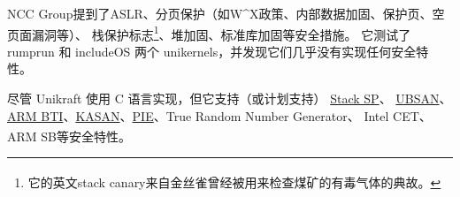 \documentclass[UTF8,fontset=none,linespread=1.15]{ctexart}
\let\nosupcite\cite
\renewcommand*{\cite}[1]{\textsuperscript{\nosupcite{#1}}}
\begin{document}
NCC Group提到了ASLR、分页保护（如W\^{}X政策、内部数据加固、保护页、空页面漏洞等）、
栈保护标志\footnote{它的英文stack canary来自金丝雀曾经被用来检查煤矿的有毒气体的典故\cite{bib:canary}。}、堆加固、标准库加固等安全措施。
它测试了 rumprun 和 includeOS 两个 unikernels，并发现它们几乎没有实现任何安全特性。

尽管 Unikraft 使用 C 语言实现，但它支持（或计划支持）
\href{https://github.com/unikraft/unikraft/tree/staging/lib/uksp}{Stack SP}、
\href{https://github.com/unikraft/unikraft/tree/staging/lib/ubsan}{UBSAN}、
\href{https://github.com/unikraft/unikraft/pull/421}{ARM BTI}、\href{https://github.com/unikraft/unikraft/pull/191}{KASAN}、\href{https://github.com/unikraft/unikraft/pull/239}{PIE}、True Random Number Generator、
Intel CET、ARM SB等安全特性。\cite{bib:unikraft-secuirty}

\end{document}
